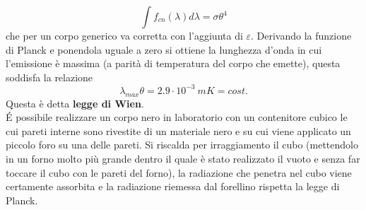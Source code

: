 \documentclass[10pt,a4paper]{article}
\begin{document}
\[\int f_{cn}(\lambda)d\lambda = \sigma \theta^4\]
che per un corpo generico va corretta con l'aggiunta di $\varepsilon$. Derivando la funzione di Planck e ponendola uguale a zero si ottiene la lunghezza d'onda in cui l'emissione è massima (a parità di temperatura del corpo che emette), questa soddisfa la relazione
\[\lambda_{max} \theta= 2.9 \cdot 10^{-3}\ m K =cost.\] 
Questa è detta \textbf{legge di Wien}.\\
\'{E} possibile realizzare un corpo nero in laboratorio con un contenitore cubico le cui pareti interne sono rivestite di un materiale nero e su cui viene applicato un piccolo foro su una delle pareti. Si riscalda per irraggiamento il cubo (mettendolo in un forno molto più grande dentro il quale è stato realizzato il vuoto e senza far toccare il cubo con le pareti del forno), la radiazione che penetra nel cubo viene certamente assorbita e la radiazione riemessa dal forellino rispetta la legge di Planck. 
\end{document}
